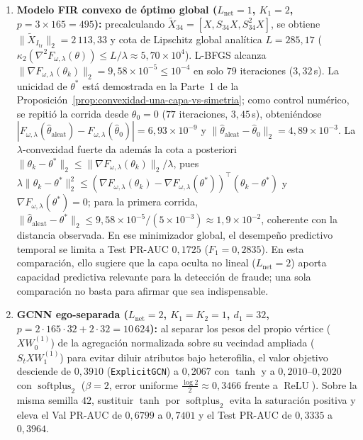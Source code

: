 \documentclass[a4paper,openany,oneside,10pt]{report}
\theoremstyle{pnlTeorema}
\theoremstyle{pnlDefinicion}
\theoremstyle{pnlObservacion}
\begin{document}
\begin{enumerate}
\item \textbf{Modelo FIR convexo de óptimo global ($L_{\mathrm{net}}=1$, $K_1=2$, $p=3\times 165=495$):} precalculando $\widetilde{X}_{34}=[X,S_{34}X,S_{34}^2X]$, se obtiene $\|\widetilde{X}_{I_{\mathrm{tr}}}\|_2=2\,113{,}33$ y cota de Lipschitz global analítica $L=285{,}17$ ($\kappa_2(\nabla^2 F_{\omega,\lambda}(\theta))\le L/\lambda\approx 5{,}70\times 10^4$). L-BFGS alcanza $\|\nabla F_{\omega,\lambda}(\theta_k)\|_2=9{,}58\times 10^{-5}\le 10^{-4}$ en solo $79$ iteraciones ($3{,}32\,$s). La unicidad de $\theta^*$ está demostrada en la Parte~1 de la Proposición~\ref{prop:convexidad-una-capa-vs-simetria}; como control numérico, se repitió la corrida desde $\theta_0=0$ ($77$ iteraciones, $3{,}45\,$s), obteniéndose $|F_{\omega,\lambda}(\hat\theta_{\mathrm{aleat}})-F_{\omega,\lambda}(\hat\theta_0)|=6{,}93\times 10^{-9}$ y $\|\hat\theta_{\mathrm{aleat}}-\hat\theta_0\|_2=4{,}89\times 10^{-3}$. La $\lambda$-convexidad fuerte da además la cota a posteriori $\|\theta_k-\theta^*\|_2\le\|\nabla F_{\omega,\lambda}(\theta_k)\|_2/\lambda$, pues $\lambda\|\theta_k-\theta^*\|_2^2\le(\nabla F_{\omega,\lambda}(\theta_k)-\nabla F_{\omega,\lambda}(\theta^*))^\top(\theta_k-\theta^*)$ y $\nabla F_{\omega,\lambda}(\theta^*)=0$; para la primera corrida, $\|\hat\theta_{\mathrm{aleat}}-\theta^*\|_2\le 9{,}58\times 10^{-5}/(5\times 10^{-3})\approx 1{,}9\times 10^{-2}$, coherente con la distancia observada. En ese minimizador global, el desempeño predictivo temporal se limita a Test PR-AUC $0{,}1725$ ($F_1=0{,}2835$). En esta comparación, ello sugiere que la capa oculta no lineal ($L_{\mathrm{net}}=2$) aporta capacidad predictiva relevante para la detección de fraude; una sola comparación no basta para afirmar que sea indispensable.
\item \textbf{GCNN ego-separada ($L_{\mathrm{net}}=2$, $K_1=K_2=1$, $d_1=32$, $p=2\cdot 165\cdot 32+2\cdot 32=10\,624$):} al separar los pesos del propio vértice ($X W_0^{(1)}$) de la agregación normalizada sobre su vecindad ampliada ($S_t X W_1^{(1)}$) para evitar diluir atributos bajo heterofilia, el valor objetivo desciende de $0{,}3910$ (\texttt{ExplicitGCN}) a $0{,}2067$ con $\tanh$ y a $0{,}2010$--$0{,}2020$ con $\operatorname{softplus}_2$ ($\beta=2$, error uniforme $\frac{\log 2}{2}\approx 0{,}3466$ frente a $\operatorname{ReLU}$). Sobre la misma semilla $42$, sustituir $\tanh$ por $\operatorname{softplus}_2$ evita la saturación positiva y eleva el Val PR-AUC de $0{,}6799$ a $0{,}7401$ y el Test PR-AUC de $0{,}3335$ a $0{,}3964$.

\end{enumerate}
\end{document}
